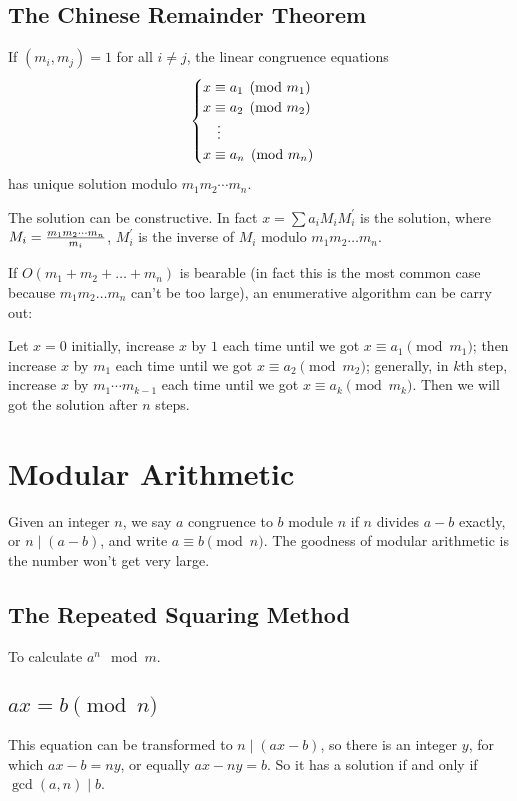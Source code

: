 \subsection{The Chinese Remainder Theorem}
\begin{thm}
If $(m_i,m_j)=1$ for all $i\neq j$, the linear congruence equations
$$\begin{cases}
x\equiv a_1\pmod{m_1}\cr
x\equiv a_2\pmod{m_2}\cr
\quad \vdots\cr
x\equiv a_n\pmod{m_n}\cr
\end{cases}$$
has unique solution modulo $m_1m_2\cdots m_n$.
\end{thm}
The solution can be constructive.
In fact $x=\sum a_iM_iM_i^\prime$ is the solution,
where $M_i={m_1m_2\cdots m_n\over m_i}$, $M_i^\prime$ is the inverse of $M_i$ modulo $m_1m_2\hdots m_n$.

If $O(m_1+m_2+\hdots+m_n)$ is bearable
(in fact this is the most common case because $m_1m_2\hdots m_n$ can't be too large),
an enumerative algorithm can be carry out:

Let $x=0$ initially, increase $x$ by $1$ each time until we got $x\equiv a_1\pmod{m_1}$;
then increase $x$ by $m_1$ each time until we got $x\equiv a_2\pmod{m_2}$;
generally, in $k$th step, increase $x$ by $m_1\cdots m_{k-1}$ each time until we got $x\equiv a_k\pmod{m_k}$.
Then we will got the solution after $n$ steps.

\section{Modular Arithmetic}
Given an integer $n$, we say $a$ congruence to $b$ module $n$ if $n$
divides $a - b$ exactly, or $n \mid (a - b)$, and write $a \equiv b \pmod n$.
The goodness of modular arithmetic is the number won't get very large.

\subsection{The Repeated Squaring Method}
To calculate $a^n \mod m$.


\subsection{$ax = b \pmod n$}
This equation can be transformed to $n \mid (ax - b)$,
so there is an integer $y$, for which $ax - b = ny$, or equally $ax - ny = b$.
So it has a solution if and only if $\gcd(a, n) \mid b$.

